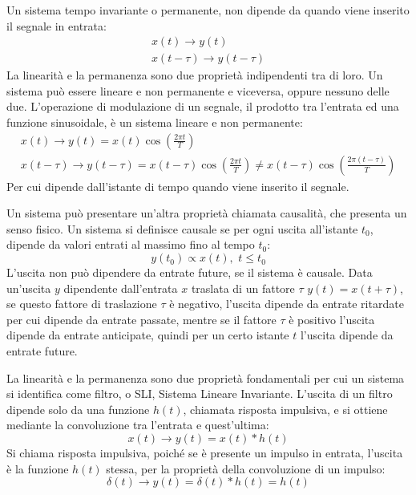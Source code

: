 \documentclass{article}
\numberwithin{equation}{subsection}
\begin{document}
Un sistema tempo invariante o permanente, non dipende da quando viene inserito il segnale in entrata:
\begin{gather*}
    x(t)\to y(t)\\
    x(t-\tau)\to y(t-\tau)
\end{gather*}
La linearità e la permanenza sono due proprietà indipendenti tra di loro. Un sistema può essere lineare e non permanente e viceversa, oppure nessuno delle due. 
L'operazione di modulazione di un segnale, il prodotto tra l'entrata ed una funzione sinusoidale, è un sistema lineare e non permanente:
\begin{gather*}
    x(t)\to y(t)=x(t)\cos\displaystyle\left(\frac{2\pi t}{T}\right)\\
    x(t-\tau)\to y(t-\tau)=x(t-\tau)\displaystyle\cos\left(\frac{2\pi t}{T}\right)\neq x(t-\tau)\cos\left(\frac{2\pi (t-\tau)}{T}\right)
\end{gather*}
Per cui dipende dall'istante di tempo quando viene inserito il segnale. 


Un sistema può presentare un'altra proprietà chiamata causalità, che presenta un senso fisico. Un sistema si definisce causale se per ogni uscita all'istante $t_0$, dipende 
da valori entrati al massimo fino al tempo $t_0$: 
\begin{equation*}
    y(t_0)\propto x(t),\,\,t\leq t_0
\end{equation*}
L'uscita non può dipendere da entrate future, se il sistema è causale.
Data un'uscita $y$ dipendente dall'entrata $x$ traslata di un fattore $\tau$ $y(t)=x(t+\tau)$, se questo fattore di traslazione $\tau$ è negativo, l'uscita dipende da entrate ritardate 
per cui dipende da entrate passate, mentre se il fattore $\tau$ è positivo l'uscita dipende da entrate anticipate, quindi per un certo istante $t$ l'uscita dipende da entrate 
future. 


La linearità e la permanenza sono due proprietà fondamentali per cui un sistema si identifica come filtro, o SLI, Sistema Lineare Invariante. L'uscita di un filtro dipende 
solo da una funzione $h(t)$, chiamata risposta impulsiva, e si ottiene mediante la convoluzione tra l'entrata e quest'ultima:
\begin{equation*}
    x(t)\to y(t)=x(t)*h(t)
\end{equation*}
Si chiama risposta impulsiva, poiché se è presente un impulso in entrata, l'uscita è la funzione $h(t)$ stessa, per la proprietà della convoluzione di un impulso:
\begin{equation*}
    \delta(t)\to y(t)=\delta(t)*h(t)=h(t)
\end{equation*}
\end{document}
